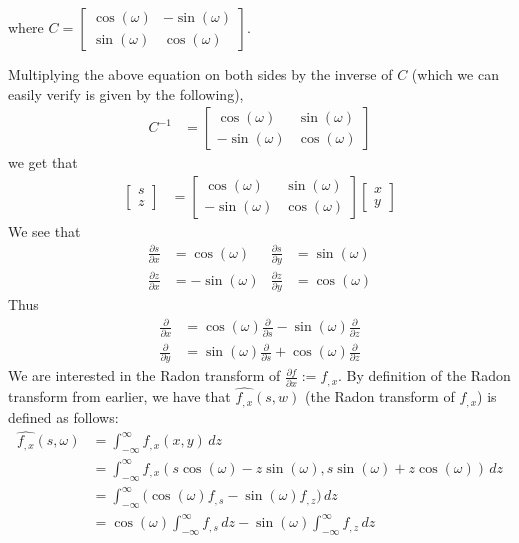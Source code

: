 \documentclass[12pt]{article}
\begin{document}
where $C = \begin{bmatrix} \cos (\omega) & - \sin (\omega) \\ \sin (\omega) & \cos (\omega)\end{bmatrix}$.
\par 
Multiplying the above equation on both sides by the inverse of $C$ (which we can easily verify is given by the following),
\begin{align*}
	C^{-1} & = 
	\begin{bmatrix}
		\cos (\omega)  & \sin(\omega) \\
		-\sin (\omega) & \cos(\omega)
	\end{bmatrix}
\end{align*}
we get that
\begin{align*}
	\begin{bmatrix}
	s \\
	z
	\end{bmatrix}
	& =
	\begin{bmatrix}
		\cos (\omega) & \sin (\omega) \\
		-\sin (\omega) & \cos (\omega)
	\end{bmatrix}
	\begin{bmatrix}
		x \\
		y
	\end{bmatrix}
\end{align*}
We see that
\begin{align*}
	\frac{\partial s}{\partial x} & = \cos (\omega) & \frac{\partial s}{\partial y} & = \sin (\omega) \\
	\frac{\partial z}{\partial x} & = -\sin (\omega) & \frac{\partial z}{\partial y} & = \cos (\omega)
\end{align*}
Thus
\begin{align*}
	\frac{\partial}{\partial x} & = \cos (\omega) \frac{\partial}{\partial s} -\sin (\omega) \frac{\partial}{\partial z} \\
	\frac{\partial}{\partial y} & = \sin (\omega) \frac{\partial}{\partial s} + \cos (\omega) \frac{\partial}{\partial z}
\end{align*}
We are interested in the Radon transform of $\frac{\partial f}{\partial x} := f_{, x}$.
By definition of the Radon transform from earlier, we have that $\widehat{f_{, x}}(s, w)$ (the Radon transform of $f_{, x}$) is defined as follows:
\begin{align*}
	\widehat{f_{, x}}(s, \omega) & = \int_{-\infty}^{\infty} f_{, x}(x, y) \, dz \\
							& = \int_{-\infty}^{\infty} f_{, x}(s \cos (\omega) - z \sin (\omega), s \sin (\omega) + z \cos (\omega)) \, dz \\
							& = \int_{-\infty}^{\infty} \Big( \cos (\omega) f_{, s} - \sin (\omega) f_{, z} \Big) \, dz \\
							& = \cos (\omega) \int_{-\infty}^{\infty} f_{, s} \, dz - \sin (\omega) \int_{-\infty}^{\infty} f_{, z} \, dz
\end{align*}
\end{document}
